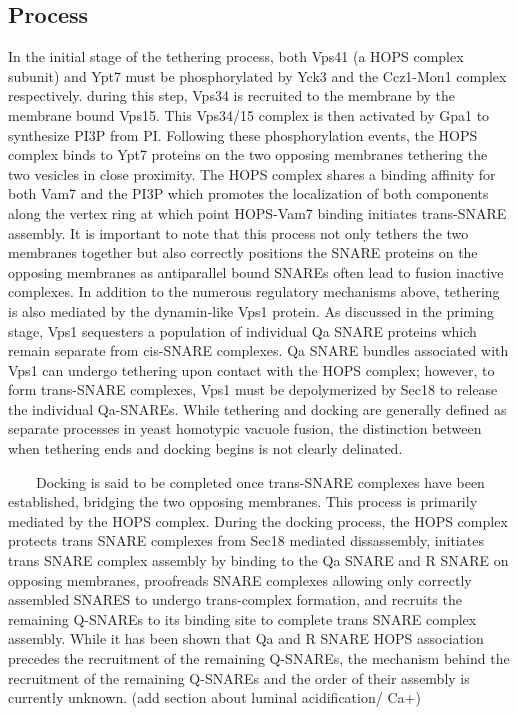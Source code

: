 \documentclass[12pt,twoside]{reedthesis}
\begin{document}
\subsection{Process}\label{process-1}

In the initial stage of the tethering process, both Vps41 (a HOPS complex subunit) and Ypt7 must be phosphorylated by Yck3 and the Ccz1-Mon1 complex respectively. during this step, Vps34 is recruited to the membrane by the membrane bound Vps15. This Vps34/15 complex is then activated by Gpa1 to synthesize PI3P from PI. Following these phosphorylation events, the HOPS complex binds to Ypt7 proteins on the two opposing membranes tethering the two vesicles in close proximity. The HOPS complex shares a binding affinity for both Vam7 and the PI3P which promotes the localization of both components along the vertex ring at which point HOPS-Vam7 binding initiates trans-SNARE assembly. It is important to note that this process not only tethers the two membranes together but also correctly positions the SNARE proteins on the opposing membranes as antiparallel bound SNAREs often lead to fusion inactive complexes. In addition to the numerous regulatory mechanisms above, tethering is also mediated by the dynamin-like Vps1 protein. As discussed in the priming stage, Vps1 sequesters a population of individual Qa SNARE proteins which remain separate from cis-SNARE complexes. Qa SNARE bundles associated with Vps1 can undergo tethering upon contact with the HOPS complex; however, to form trans-SNARE complexes, Vps1 must be depolymerized by Sec18 to release the individual Qa-SNAREs. While tethering and docking are generally defined as separate processes in yeast homotypic vacuole fusion, the distinction between when tethering ends and docking begins is not clearly delinated.\\
\strut ~~~~Docking is said to be completed once trans-SNARE complexes have been established, bridging the two opposing membranes. This process is primarily mediated by the HOPS complex. During the docking process, the HOPS complex protects trans SNARE complexes from Sec18 mediated dissassembly, initiates trans SNARE complex assembly by binding to the Qa SNARE and R SNARE on opposing membranes, proofreads SNARE complexes allowing only correctly assembled SNARES to undergo trans-complex formation, and recruits the remaining Q-SNAREs to its binding site to complete trans SNARE complex assembly. While it has been shown that Qa and R SNARE HOPS association precedes the recruitment of the remaining Q-SNAREs, the mechanism behind the recruitment of the remaining Q-SNAREs and the order of their assembly is currently unknown. (add section about luminal acidification/ Ca+)
\end{document}
